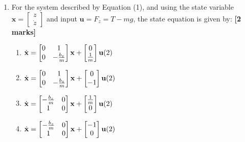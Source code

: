 \documentclass{article}
\begin{document}
\begin{enumerate}
    \item For the system described by Equation (1), and using the state variable $\mathbf{x} = \begin{bmatrix} z \\ \dot{z} \end{bmatrix}$ and input $\mathbf{u} = F_z = T - mg$, the state equation is given by: \hfill \textbf{[2 marks]}
    
    \begin{enumerate}[label=\alph*.]
        \item $\dot{\mathbf{x}} = \begin{bmatrix} 0 & 1 \\ 0 & -\frac{b_z}{m} \end{bmatrix} \mathbf{x} + \begin{bmatrix} 0 \\ \frac{1}{m} \end{bmatrix} \mathbf{u} \hfill (2)$
        \vspace{2mm}
        
        \item $\dot{\mathbf{x}} = \begin{bmatrix} 0 & 1 \\ 0 & -\frac{b_z}{m} \end{bmatrix} \mathbf{x} + \begin{bmatrix} 0 \\ -1 \end{bmatrix} \mathbf{u} \hfill (2)$
        \vspace{2mm}
        
        \item $\dot{\mathbf{x}} = \begin{bmatrix} -\frac{b_z}{m} & 0 \\ 1 & 0 \end{bmatrix} \mathbf{x} + \begin{bmatrix} \frac{1}{m} \\ 0 \end{bmatrix} \mathbf{u} \hfill (2)$
        \vspace{2mm}
        
        \item $\dot{\mathbf{x}} = \begin{bmatrix} -\frac{b_z}{m} & 0 \\ 1 & 0 \end{bmatrix} \mathbf{x} + \begin{bmatrix} -1 \\ 0 \end{bmatrix} \mathbf{u} \hfill (2)$
        \vspace{2mm}
        

\end{enumerate}
\end{enumerate}
\end{document}
